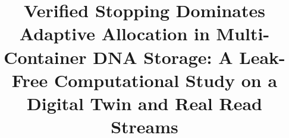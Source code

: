 \documentclass[conference,onecolumn,11pt]{IEEEtran}
\begin{document}
\title{Verified Stopping Dominates Adaptive Allocation in Multi-Container DNA Storage: A Leak-Free Computational Study on a Digital Twin and Real Read Streams}

\author{
\and
{}
\and
{}
}

\maketitle
\end{document}
